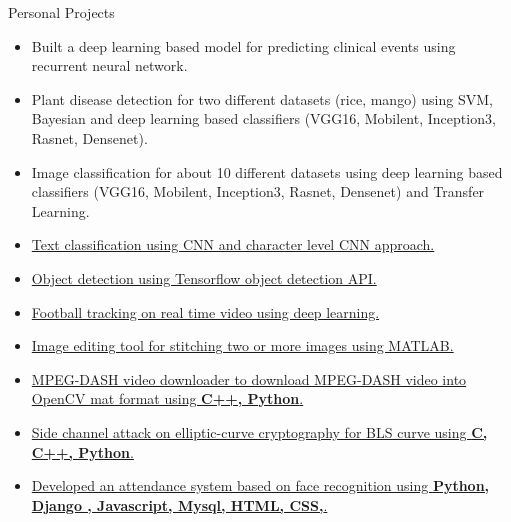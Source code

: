 \documentclass[]{mcdowellcv}
\begin{document}
    \begin{cvsection}{Personal Projects}
		\begin{cvsubsection}{}{}{}	
		       \vspace{2.1pt}
			\begin{itemize}
				\item Built a deep learning based model for predicting clinical events using recurrent neural network.
				\item Plant disease detection for two different  datasets (rice, mango) using  SVM, Bayesian and deep learning based classifiers (VGG16, Mobilent, Inception3, Rasnet, Densenet).
				\item Image classification for about 10 different  datasets using  deep learning based classifiers (VGG16, Mobilent, Inception3, Rasnet, Densenet) and Transfer Learning.
			    \item \href{https://github.com/mahbubcseju/CNN-for-text-classification-using-keras-for-yoon-kim-paper} {Text classification using CNN and character level CNN approach.}
			     \item \href{https://github.com/mahbubcseju/object_detection_using_tensorflow} {Object detection using Tensorflow object detection API.}
			    \item \href{https://github.com/mahbubcseju/Football_Tracking_using_Tensorflow} {Football tracking on real time video using deep learning.}
				\item \href{https://github.com/mahbubcseju/Automatic_Image_Stitching_using_Feature_Based_Method}{Image editing tool for stitching two or more images using MATLAB.} 
				\item \href{https://github.com/mahbubcseju/Downloader_MPEG_DASH_to_Opencv_Mat_using_libdash_Bitmovin}{MPEG-DASH video downloader to download MPEG-DASH video into OpenCV mat format using \textbf{C++, Python}.} 
				\item \href{https://github.com/mahbubcseju/Side-channel-Attack}{Side channel attack on  elliptic-curve cryptography for BLS curve using \textbf{C, C++, Python}.} 
				\item \href{https://github.com/mahbubcseju/attendance-by-face-recognition}{Developed an attendance system based on face recognition using \textbf{Python, Django , Javascript, Mysql, HTML, CSS,}.} 
			\end{itemize}
		\end{cvsubsection}
	\end{cvsection}
\end{document}
